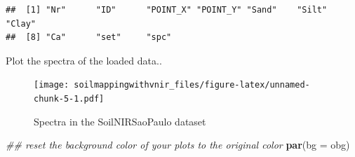 \documentclass[]{book}
\newenvironment{Shaded}{\begin{snugshade}}{\end{snugshade}}
\newcommand{\CommentTok}[1]{\textcolor[rgb]{0.56,0.35,0.01}{\textit{#1}}}
\newcommand{\DataTypeTok}[1]{\textcolor[rgb]{0.13,0.29,0.53}{#1}}
\newcommand{\DecValTok}[1]{\textcolor[rgb]{0.00,0.00,0.81}{#1}}
\newcommand{\FloatTok}[1]{\textcolor[rgb]{0.00,0.00,0.81}{#1}}
\newcommand{\KeywordTok}[1]{\textcolor[rgb]{0.13,0.29,0.53}{\textbf{#1}}}
\newcommand{\NormalTok}[1]{#1}
\newcommand{\OperatorTok}[1]{\textcolor[rgb]{0.81,0.36,0.00}{\textbf{#1}}}
\newcommand{\StringTok}[1]{\textcolor[rgb]{0.31,0.60,0.02}{#1}}
\begin{document}
\begin{verbatim}
##  [1] "Nr"      "ID"      "POINT_X" "POINT_Y" "Sand"    "Silt"    "Clay"   
##  [8] "Ca"      "set"     "spc"
\end{verbatim}

Plot the spectra of the loaded data..

\begin{Shaded}
\end{Shaded}

\begin{figure}
\centering
\texttt{[image: soilmappingwithvnir\_files/figure-latex/unnamed-chunk-5-1.pdf]}
\caption{\label{fig:unnamed-chunk-5}Spectra in the SoilNIRSaoPaulo dataset}
\end{figure}

\begin{Shaded}
\begin{Highlighting}[]
\CommentTok{## reset the background color of your plots to the original color}
\KeywordTok{par}\NormalTok{(}\DataTypeTok{bg =}\NormalTok{ obg)}
\end{Highlighting}
\end{Shaded}
\end{document}
